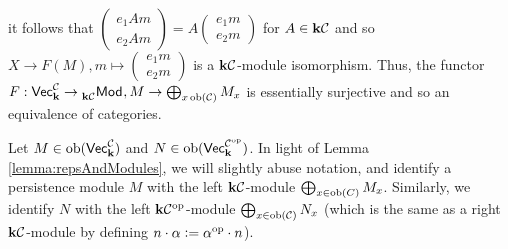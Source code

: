 \begin{example}
    it follows that $\begin{pmatrix}e_1 A m\\ e_2 A m\end{pmatrix}=A\begin{pmatrix}e_1 m\\ e_2 m\end{pmatrix}$ for $A\in\mathbf{k}\mathcal{C}$ and so $X\to F(M), m\mapsto\begin{pmatrix}e_1m\\ e_2m\end{pmatrix}$ is a $\mathbf{k}\mathcal{C}$-module isomorphism.
    Thus, the functor $F:\normalfont\mathsf{Vec}_{\mathbf{k}}^{\mathcal{C}}\to\prescript{}{\mathbf{k}\mathcal{C}}{\normalfont\mathsf{Mod}}_{}, M\to\bigoplus_{x\operatorname{ob}(\mathcal{C})}M_x$ is essentially surjective and so an equivalence of categories.
\end{example}


Let $M\in\operatorname{ob}(\normalfont\mathsf{Vec}_{\mathbf{k}}^{\mathcal{C}})$ and $N\in\operatorname{ob}(\normalfont\mathsf{Vec}_{\mathbf{k}}^{\mathcal{C}^{\text{op}}})$.
In light of Lemma \ref{lemma:repsAndModules}, we will slightly abuse notation, and identify a persistence module $M$ with the left $\mathbf{k}\mathcal{C}$-module $\bigoplus_{x\in\operatorname{ob}(C)}M_x$.
Similarly, we identify $N$ with the left $\mathbf{k}\mathcal{C}^{\text{op}}$-module $\bigoplus_{x\in\operatorname{ob}(\mathcal{C})}N_x$ (which is the same as a right $\mathbf{k}\mathcal{C}$-module by defining $n\cdot\alpha\vcentcolon=\alpha^{\text{op}}\cdot n$). 

